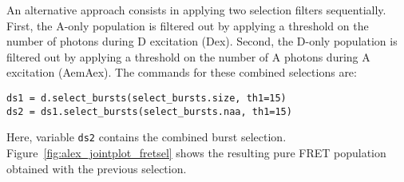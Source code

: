 An alternative approach consists in applying two selection filters sequentially.
First, the A-only population is filtered out
by applying a threshold on the number of photons during D excitation (Dex).
Second, the D-only population is filtered out by applying a threshold on 
the number of A photons during A excitation (AemAex).
The commands for these combined selections are:

\begin{lstlisting}
ds1 = d.select_bursts(select_bursts.size, th1=15)
ds2 = ds1.select_bursts(select_bursts.naa, th1=15)
\end{lstlisting}

Here, variable \verb|ds2| contains the combined burst selection.
Figure~\ref{fig:alex_jointplot_fretsel} shows the resulting pure FRET
population obtained with the previous selection.
